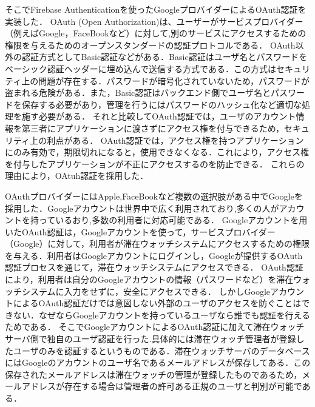 そこでFirebase Authenticationを使ったGoogleプロバイダーによるOAuth認証を実装した．
OAuth (Open Authorization)は、ユーザーがサービスプロバイダー（例えばGoogle，FaceBookなど）に対して,別のサービスにアクセスするための権限を与えるためのオープンスタンダードの認証プロトコルである．
OAuth以外の認証方式としてBasic認証などがある．Basic認証はユーザ名とパスワードをベーシック認証ヘッダーに埋め込んで送信する方式である．この方式はセキュリティ上の問題が存在する．パスワードが暗号化されていないため，パスワードが盗まれる危険がある．また，Basic認証はバックエンド側でユーザ名とパスワードを保存する必要があり，管理を行うにはパスワードのハッシュ化など適切な処理を施す必要がある．
それと比較してOAuth認証では，ユーザのアカウント情報を第三者にアプリケーションに渡さずにアクセス権を付与できるため，セキュリティ上の利点がある．
OAuth認証では，アクセス権を持つアプリケーションにのみ有効で，期限切れになると，使用できなくなる．これにより，アクセス権を付与したアプリケーションが不正にアクセスするのを防止できる．
これらの理由により，OAtuh認証を採用した．

OAuthプロバイダーにはApple,FaceBookなど複数の選択肢がある中でGoogleを採用した．Googleアカウントは世界中で広く利用されており,多くの人がアカウントを持っているおり,多数の利用者に対応可能である．
Googleアカウントを用いたOAuth認証は，Googleアカウントを使って，サービスプロバイダー（Google）に対して，利用者が滞在ウォッチシステムにアクセスするための権限を与える．利用者はGoogleアカウントにログインし，Googleが提供するOAuth認証プロセスを通じて，滞在ウォッチシステムにアクセスできる．
OAuth認証により，利用者は自分のGoogleアカウントの情報（パスワードなど）を滞在ウォッチシステムに入力をせずに，安全にアクセスできる．
しかしGoogleアカウントによるOAuth認証だけでは意図しない外部のユーザのアクセスを防ぐことはできない．なぜならGoogleアカウントを持っているユーザなら誰でも認証を行えるためである．
そこでGoogleアカウントによるOAuth認証に加えて滞在ウォッチサーバ側で独自のユーザ認証を行った.具体的には滞在ウォッチ管理者が登録したユーザのみを認証するというものである．滞在ウォッチサーバのデータベースにはGoogleのアカウントのユーザ名であるメールアドレスが保存してある．この保存されたメールアドレスは滞在ウォッチの管理が登録したものであるため，メールアドレスが存在する場合は管理者の許可ある正規のユーザと判別が可能である．

